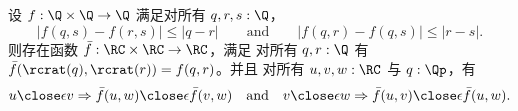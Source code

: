 \begin{lem} \label{RC-binary-nonexpanding-extension}
  设 $f : \Q \times \Q \to \Q$ 满足对所有 $q, r, s : \Q$，
  \begin{equation*}
    |f(q, s) - f(r, s)| \leq |q - r|
    \qquad\text{and}\qquad
    |f(q, r) - f(q, s)| \leq |r - s|.
  \end{equation*}
  则存在函数 $\bar{f} : \RC \times \RC \to \RC$，满足
  对所有 $q, r : \Q$ 有 $\bar{f}(\rcrat(q), \rcrat(r)) = f(q,r)$。并且
  对所有 $u, v, w : \RC$ 与 $q : \Qp$，有
  \begin{equation*}
    u \close\epsilon v \Rightarrow \bar{f}(u,w) \close\epsilon \bar{f}(v,w)
    \quad\text{and}\quad
    v \close\epsilon w \Rightarrow \bar{f}(u,v) \close\epsilon \bar{f}(u,w).
  \end{equation*}
\end{lem}

